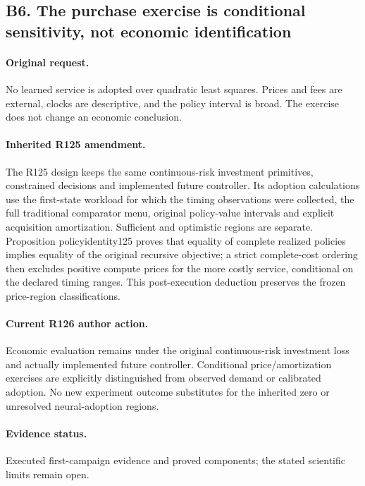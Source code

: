 \subsection*{B6. The purchase exercise is conditional sensitivity, not economic identification}
\paragraph{Original request.} No learned service is adopted over quadratic least squares. Prices and fees are external, clocks are descriptive, and the policy interval is broad. The exercise does not change an economic conclusion.

\paragraph{Inherited R125 amendment.} The R125 design keeps the same continuous-risk investment primitives, constrained decisions and implemented future controller. Its adoption calculations use the first-state workload for which the timing observations were collected, the full traditional comparator menu, original policy-value intervals and explicit acquisition amortization. Sufficient and optimistic regions are separate. Proposition policyidentity125 proves that equality of complete realized policies implies equality of the original recursive objective; a strict complete-cost ordering then excludes positive compute prices for the more costly service, conditional on the declared timing ranges. This post-execution deduction preserves the frozen price-region classifications.

\paragraph{Current R126 author action.} Economic evaluation remains under the original continuous-risk investment loss and actually implemented future controller. Conditional price/amortization exercises are explicitly distinguished from observed demand or calibrated adoption. No new experiment outcome substitutes for the inherited zero or unresolved neural-adoption regions.

\paragraph{Evidence status.} Executed first-campaign evidence and proved components; the stated scientific limits remain open.

